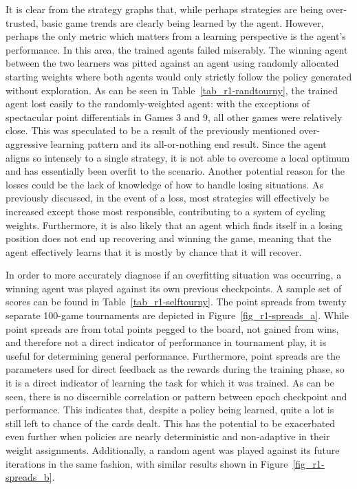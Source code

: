 It is clear from the strategy graphs that,
while perhaps strategies are being over-trusted,
basic game trends are clearly being learned by the agent.
%
However, perhaps the only metric which matters from a learning perspective is
the agent's performance.
%
In this area, the trained agents failed miserably.
%
The winning agent between the two learners was pitted against
an agent using randomly allocated starting weights
where both agents would only strictly follow the policy generated
without exploration.
%
As can be seen in Table~\ref{tab_r1-randtourny},
the trained agent lost easily to the randomly-weighted agent:
with the exceptions of spectacular point differentials in Games 3 and 9,
all other games were relatively close.
%
This was speculated to be a result of the previously mentioned over-aggressive
learning pattern and its all-or-nothing end result.
%
Since the agent aligns so intensely to a single strategy,
it is not able to overcome a local optimum
and has essentially been overfit to the scenario.
%
Another potential reason for the losses could be the lack of knowledge of how to
handle losing situations.
%
As previously discussed,
in the event of a loss,
most strategies will effectively be increased except those most responsible,
contributing to a system of cycling weights.
%
Furthermore, it is also likely that an agent which finds itself in a losing
position does not end up recovering and winning the game,
meaning that
the agent effectively learns that it is mostly by chance that it will recover.




In order to more accurately diagnose if an overfitting situation was occurring,
a winning agent was played against its own previous checkpoints.
%
A sample set of scores can be found in Table~\ref{tab_r1-selftourny}.
%
The point spreads from twenty separate 100-game tournaments
are depicted in Figure~\ref{fig_r1-spreads_a}.
%
While point spreads are from total points pegged to the board,
not gained from wins,
and therefore not a direct indicator of performance in tournament play,
it is useful for determining general performance.
%
Furthermore,
point spreads are the parameters used for direct feedback as the rewards
during the training phase,
so it is a direct indicator of learning the task for which it was trained.
%
As can be seen, there is no discernible correlation or pattern between
epoch checkpoint and performance.
%
This indicates that,
despite a policy being learned,
quite a lot is still left to chance of the cards dealt.
%
This has the potential to be exacerbated even further when policies are nearly
deterministic and non-adaptive in their weight assignments.
%
Additionally,
a random agent was played against its future iterations in the same fashion,
with similar results shown in Figure~\ref{fig_r1-spreads_b}.


